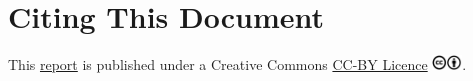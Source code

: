 \documentclass[12pt, oneside]{report}
\begin{document}

\newpage

\thispagestyle{empty}

\section*{Citing This Document}

This \href{https://github.com/soukhova/MJ-Accessibility-Blogs}{report} is published under a Creative Commons \href{https://creativecommons.org/licenses/by/4.0/}{CC-BY Licence} \includegraphics[height=11pt]{images/cc-by.png}.

\end{document}
